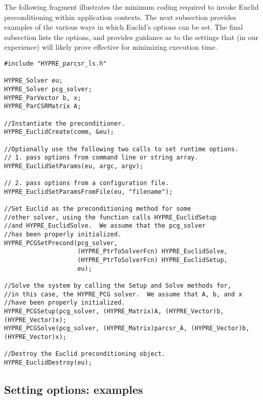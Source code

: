 
The following fragment illustrates the minimum coding %
required to invoke Euclid preconditioning within \hypre{} application contexts.
The next subsection provides examples of the various ways in which
Euclid's options can be set. 
The final subsection lists the options,
and provides guidance as to the settings that (in our experience) 
will likely prove effective for minimizing execution time.

\begin{display}
\begin{verbatim}
#include "HYPRE_parcsr_ls.h"

HYPRE_Solver eu;
HYPRE_Solver pcg_solver;
HYPRE_ParVector b, x;
HYPRE_ParCSRMatrix A;

//Instantiate the preconditioner.
HYPRE_EuclidCreate(comm, &eu);

//Optionally use the following two calls to set runtime options.
// 1. pass options from command line or string array.
HYPRE_EuclidSetParams(eu, argc, argv);

// 2. pass options from a configuration file.
HYPRE_EuclidSetParamsFromFile(eu, "filename");

//Set Euclid as the preconditioning method for some
//other solver, using the function calls HYPRE_EuclidSetup
//and HYPRE_EuclidSolve.  We assume that the pcg_solver
//has been properly initialized.
HYPRE_PCGSetPrecond(pcg_solver,
                    (HYPRE_PtrToSolverFcn) HYPRE_EuclidSolve,
                    (HYPRE_PtrToSolverFcn) HYPRE_EuclidSetup,
                    eu);

//Solve the system by calling the Setup and Solve methods for, 
//in this case, the HYPRE_PCG solver.  We assume that A, b, and x
//have been properly initialized.
HYPRE_PCGSetup(pcg_solver, (HYPRE_Matrix)A, (HYPRE_Vector)b, (HYPRE_Vector)x);
HYPRE_PCGSolve(pcg_solver, (HYPRE_Matrix)parcsr_A, (HYPRE_Vector)b, (HYPRE_Vector)x);

//Destroy the Euclid preconditioning object.
HYPRE_EuclidDestroy(eu);

\end{verbatim}
\end{display}


\subsection{Setting options: examples}

